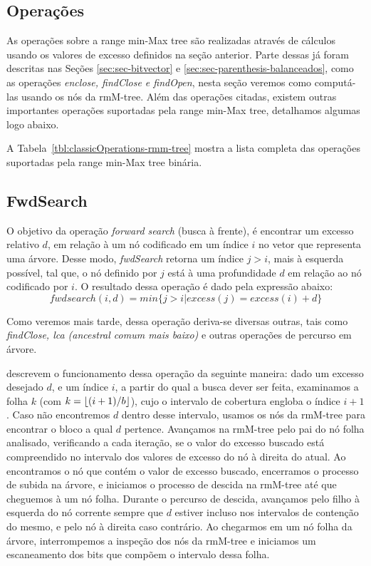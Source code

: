 \newpage


\subsection{Operações}
As operações sobre a range min-Max tree são realizadas através de cálculos usando os valores de excesso definidos na seção anterior.  Parte dessas já foram descritas nas Seções \ref{sec:sec-bitvector} e \ref{sec:sec-parenthesis-balanceados}, como as operações  \textit{enclose, findClose  e  findOpen}, nesta seção veremos como computá-las usando os nós da rmM-tree.
Além das operações citadas, existem outras importantes operações suportadas pela range min-Max tree, detalhamos algumas logo abaixo. 

A Tabela~\ref{tbl:classicOperations-rmm-tree} mostra a lista completa das operações suportadas pela range min-Max tree binária.

\subsection{FwdSearch}\label{sec:fwdsearch-bin}
    O objetivo da operação \textit{forward search} (busca à frente), é encontrar um excesso relativo $d$, em relação à um nó codificado em um índice $i$ no vetor que representa uma árvore. Desse modo, \textit{ fwdSearch} retorna um índice $j>i$, mais à esquerda possível, tal que, o nó definido por $j$ está à uma profundidade $d$ em relação ao nó codificado por $i$. O resultado dessa operação é dado pela expressão abaixo:
    $$fwdsearch(i,d) = min\{j > i | excess(j) = excess(i) + d\}$$
    
    Como veremos mais tarde, dessa operação deriva-se diversas outras, tais como \textit{findClose, lca (ancestral comum mais baixo)} e outras operações de percurso em árvore.

    \citet{paper-simple-and-efficient-fully-functional-succinct-trees} descrevem o funcionamento dessa operação da seguinte maneira: dado um excesso desejado $d$, e um índice $i$, a partir do qual a busca dever ser feita, examinamos a folha $k$ (com $k= \lfloor(i+1)/b\rfloor$), cujo o intervalo de cobertura engloba o índice $i+1$.
    Caso não encontremos $d$ dentro desse intervalo, usamos os nós da rmM-tree para encontrar o bloco a qual $d$ pertence. Avançamos na rmM-tree pelo pai do nó folha analisado, verificando a cada iteração, se o valor do excesso buscado está compreendido no intervalo dos valores de excesso do nó à direita do atual. Ao encontramos o nó que contém o valor de excesso buscado, encerramos o processo de subida na árvore, e iniciamos o processo de descida na rmM-tree até que cheguemos à um nó folha. Durante o percurso de descida, avançamos pelo filho à esquerda do nó corrente sempre que $d$ estiver incluso nos intervalos de contenção do mesmo, e pelo nó à direita caso contrário. Ao chegarmos em um nó folha da árvore, interrompemos a inspeção dos nós da rmM-tree e iniciamos um escaneamento dos bits que compõem o intervalo dessa folha.

